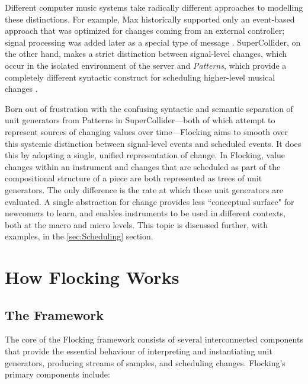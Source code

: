 \documentclass{article}
\begin{document}
Different computer music systems take radically different approaches to modelling these distinctions. For example, Max historically supported only an event-based approach that was optimized for changes coming from an external controller; signal processing was added later as a special type of message \cite{puckette2002max}. SuperCollider, on the other hand, makes a strict distinction between signal-level changes, which occur in the isolated environment of the server \cite{mccartney1996supercollider} and {\it Patterns}, which provide a completely different syntactic construct for scheduling higher-level musical changes \cite[pp. 189]{wilson2011supercollider}.

Born out of frustration with the confusing syntactic and semantic separation of unit generators from Patterns in SuperCollider---both of which attempt to represent sources of changing values over time---Flocking aims to smooth over this systemic distinction between signal-level events and scheduled events. It does this by adopting a single, unified representation of change. In Flocking, value changes within an instrument and changes that are scheduled as part of the compositional structure of a piece are both represented as trees of unit generators. The only difference is the rate at which these unit generators are evaluated. A single abstraction for change provides less ``conceptual surface" for newcomers to learn, and enables instruments to be used in different contexts, both at the macro and micro levels. This topic is discussed further, with examples, in the \ref{sec:Scheduling} section.

\section{How Flocking Works}

\subsection{The Framework}

The core of the Flocking framework consists of several interconnected components that provide the essential behaviour of interpreting and instantiating unit generators, producing streams of samples, and scheduling changes. Flocking's primary components include:
\end{document}
